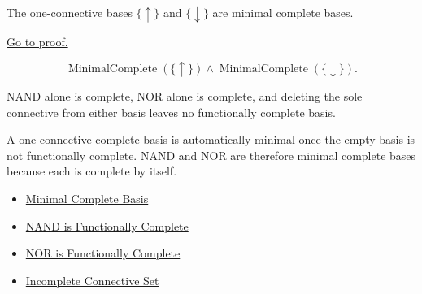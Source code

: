 \begin{tcolorbox}[colback=thmbox, colframe=thmborder, arc=2pt,
  left=6pt, right=6pt, top=4pt, bottom=4pt,
  title={\small\textbf{Theorem (NAND and NOR are Minimal Complete Bases)}},
  fonttitle=\small\bfseries]
\begin{theorem}
\label{thm:nand-nor-minimal-complete-bases-propositional-logic}
The one-connective bases \(\{\uparrow\}\) and \(\{\downarrow\}\) are minimal
complete bases.

\noindent\hyperref[prf:nand-nor-minimal-complete-bases-propositional-logic]{Go to proof.}
\end{theorem}
\end{tcolorbox}

\begin{remark*}
\[
\operatorname{MinimalComplete}(\{\uparrow\})
\land
\operatorname{MinimalComplete}(\{\downarrow\}).
\]
\end{remark*}

\begin{remark*}
NAND alone is complete, NOR alone is complete, and deleting the sole connective
from either basis leaves no functionally complete basis.
\end{remark*}

\begin{remark*}[Interpretation]
A one-connective complete basis is automatically minimal once the empty basis is
not functionally complete. NAND and NOR are therefore minimal complete bases
because each is complete by itself.
\end{remark*}

\begin{dependencies}
\begin{itemize}
  \item \hyperref[def:minimal-complete-basis-propositional-logic]{Minimal Complete Basis}
  \item \hyperref[thm:nand-functionally-complete-propositional-logic]{NAND is Functionally Complete}
  \item \hyperref[thm:nor-functionally-complete-propositional-logic]{NOR is Functionally Complete}
  \item \hyperref[def:incomplete-connective-set-propositional-logic]{Incomplete Connective Set}
\end{itemize}
\end{dependencies}

